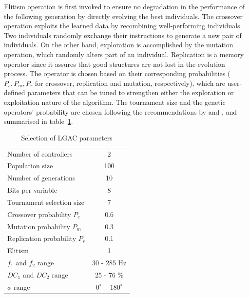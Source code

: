 Elitism operation is first invoked to ensure no degradation in the performance of the following generation by directly evolving the best individuals. The crossover operation exploits the learned data by recombining well-performing individuals. Two individuals randomly exchange their instructions to generate a new pair of individuals. On the other hand, exploration is accomplished by the mutation operation, which randomly alters part of an individual. Replication is a memory operator since it assures that good structures are not lost in the evolution process. The operator is chosen based on their corresponding probabilities ($P_c,P_m,P_r$ for crossover, replication and mutation, respectively), which are user-defined parameters that can be tuned to strengthen either the exploration or exploitation nature of the algorithm. The tournament size and the genetic operators' probability are chosen following the recommendations by \citet{duriez2017book} and \citet{Castellanos2022LGPCvsRL}, and summarised in table~\ref{tab:GAparameters}.

\begin{table}[h]
    \centering
    \begin{tabular}{lc}
        \toprule
        Number of controllers                       & 2 \\
        Population size                             & 100 \\
        Number of generations                       & 10 \\ %
        Bits per variable                           & 8 \\
        Tournament selection size                   & 7   \\ 
        Crossover probability $P_c$                 & 0.6 \\ 
        Mutation probability $P_m$                  & 0.3 \\
        Replication probability $P_r$               & 0.1 \\
        Elitism                                     & 1   \\ 
        $f_1$ and $f_2$ range                       & 30 - 285 Hz   \\
        $DC_1$ and $DC_2$ range                     & 25 - 76 \%   \\ 
        $\phi$ range                                & $0^\circ - 180^\circ$ \\ \bottomrule
    \end{tabular}
    \caption{Selection of LGAC parameters} \label{tab:GAparameters}
\end{table}

